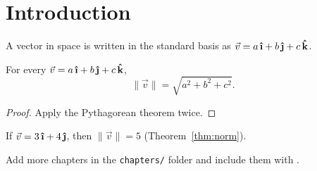 \chapter{Introduction}
\label{ch:introduction}

\begin{definition}
  A vector in space is written in the standard basis as
  $\vec{v} = a\,\ihat + b\,\jhat + c\,\khat$.
\end{definition}

\begin{theorem}
  \label{thm:norm}
  For every $\vec{v} = a\,\ihat + b\,\jhat + c\,\khat$,
  \[
    \lVert \vec{v} \rVert = \sqrt{a^2 + b^2 + c^2}.
  \]
\end{theorem}

\begin{proof}
  Apply the Pythagorean theorem twice.
\end{proof}

\begin{example}
  If $\vec{v} = 3\,\ihat + 4\,\jhat$, then $\lVert \vec{v} \rVert = 5$
  (Theorem~\ref{thm:norm}).
\end{example}

\begin{remark}
  Add more chapters in the \texttt{chapters/} folder and include them with \verb||.
\end{remark}
